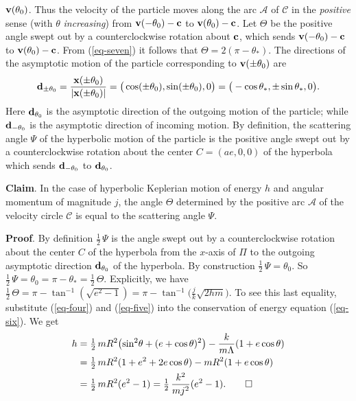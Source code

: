 \documentclass[11pt,openbib]{article}
\newcommand{\onehalf}{\mbox{$\frac{\scriptstyle 1}{\scriptstyle 2}\,$}}
\begin{document}
${\bf v}({\theta }_0)$. Thus the velocity of the particle moves along the arc $\mathcal{A}$ of 
$\mathcal{C}$ in the \emph{positive} sense (with $\theta $ \emph{increasing}) from ${\bf v}(-{\theta }_0)-{\bf c}$ to 
${\bf v}({\theta }_0) - {\bf c}$. Let $\Theta $ be the positive angle swept out by a counterclockwise rotation about ${\bf c}$, which sends ${\bf v}(-{\theta }_0)- {\bf c}$ to ${\bf v}({\theta }_0)-{\bf c}$. From (\ref{eq-seven}) it follows that 
$\Theta = 2(\pi - {\theta }_{\ast })$. The directions of the asymptotic motion of the particle corresponding to 
${\bf v}(\pm {\theta }_0)$ are 
\begin{equation}
{\bf d}_{\pm {\theta }_0} = \frac{{\bf x}(\pm {\theta }_0)}{|{\bf x}(\pm {\theta }_0)|} = 
\big( \cos (\pm {\theta }_0), \sin (\pm {\theta }_0), 0 \big) = \big( -\cos {\theta }_{\ast }, \pm \sin {\theta }_{\ast }, 0 \big). 
\label{eq-eight}
\end{equation}
Here ${\bf d}_{{\theta }_0}$ is the asymptotic direction of the outgoing motion of the particle; while ${\bf d}_{-{\theta }_0}$ 
is the asymptotic direction of incoming motion. By definition, the scattering angle $\Psi $ of the hyperbolic 
motion of the particle is the positive angle swept out by a counterclockwise rotation about the center $C =(ae,0,0)$ of the 
hyperbola which sends ${\bf d}_{-{\theta }_0}$ to ${\bf d}_{{\theta }_0}$.  \medskip 

\noindent \textbf{Claim}. In the case of hyperbolic Keplerian motion of energy $h$ and angular momentum of 
magnitude $j$, the angle $\Theta $ determined by the positive arc $\mathcal{A}$ of the velocity circle 
$\mathcal{C}$ is equal to the scattering angle $\Psi $.  \medskip 

\noindent \textbf{Proof}. By definition $\onehalf \Psi $ is the angle swept out by a counterclockwise rotation about the center $C$ of the hyperbola from the $x$-axis of $\Pi $ to the outgoing asymptotic direction ${\bf d}_{{\theta }_0}$ of the hyperbola. By construction $\onehalf \Psi = {\theta }_0$. So 
$\onehalf \Psi = {\theta }_0 = \pi - {\theta }_{\ast } = \onehalf \Theta $. Explicitly, we have 
$\onehalf \Theta = \pi - {\tan }^{-1}(\sqrt{e^2-1}) = \pi -{\tan }^{-1}\big( \frac{j}{k}\sqrt{2hm} \big) $. 
To see this last equality, substitute (\ref{eq-four}) and (\ref{eq-five}) into the conservation of energy equation 
(\ref{eq-six}). We get 
\begin{align}
h & = \onehalf mR^2 \big( {\sin }^2\theta +(e+\cos \theta )^2 \big) - \frac{k}{m\Lambda} (1+e \cos \theta ) \notag \\
& = \onehalf mR^2 (1 +e^2 + 2e\cos \theta ) - mR^2 (1+e\cos \theta ) \notag \\
& = \onehalf mR^2(e^2-1) = \onehalf \frac{k^2}{mj^2}(e^2-1). \tag*{$\square $}
\end{align}
\end{document}
